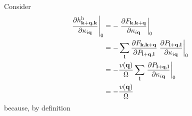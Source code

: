 
 Consider
\begin{align}
    \left.
    \frac{\partial
    h^{\rm h}_{\mathbf k+\mathbf q,\mathbf k}}
    {\partial\kappa_{i\mathbf q}}
    \right|_0
    &=
    -
    \left.
    \frac{\partial
    F_{\mathbf k,\mathbf k+\mathbf q}}
    {\partial\kappa_{i\mathbf q}}
    \right|_0
    \\
    &=
    -
    \sum_{\mathbf l}
    \frac{\partial
    F_{\mathbf k,\mathbf k+\mathbf q}}
    {\partial P_{\mathbf l + \mathbf q,\mathbf l}}
    \left.
    \frac{\partial
    P_{\mathbf l + \mathbf q,\mathbf l}}
    {\partial\kappa_{i\mathbf q}}
    \right|_0 \\
&= 
    -
\frac{v(\mathbf q)}{\Omega} \sum_{\mathbf l}
    \left.
    \frac{\partial
    P_{\mathbf l + \mathbf q,\mathbf l}}
    {\partial\kappa_{i\mathbf q}}
    \right|_0\\
&= 
    -
\frac{v(\mathbf q)}{\Omega}
\end{align}
because, by definition 

